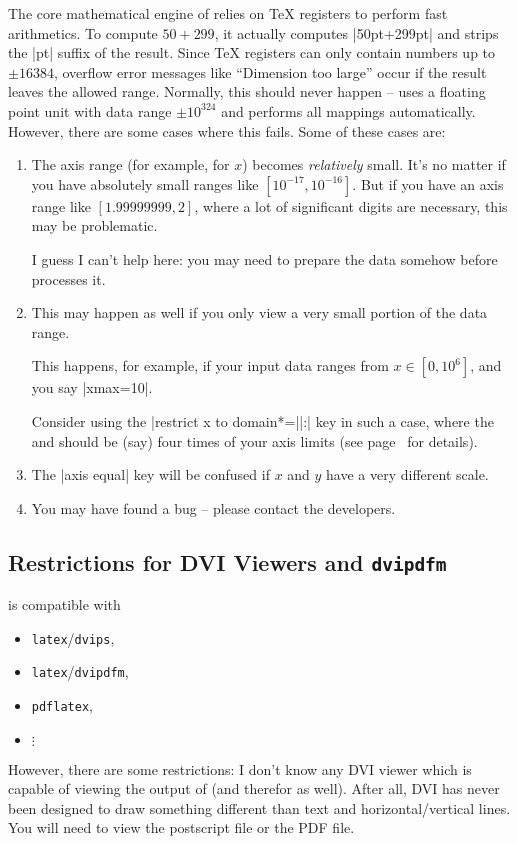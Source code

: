 The core mathematical engine of \PGF{} relies on \TeX{} registers to perform
fast arithmetics. To compute $50+299$, it actually computes |50pt+299pt| and
strips the |pt| suffix of the result. Since \TeX{} registers can only contain
numbers up to $\pm 16384$, overflow error messages like ``Dimension too large''
occur if the result leaves the allowed range. Normally, this should never
happen -- \PGFPlots{} uses a floating point unit with data range $\pm 10^{324}$
and performs all mappings automatically. However, there are some cases where
this fails. Some of these cases are:
%
\begin{enumerate}
    \item The axis range (for example, for $x$) becomes \emph{relatively}
        small. It's no matter if you have absolutely small ranges like
        $[10^{-17},10^{-16}]$. But if you have an axis range like
        $[1.99999999,2]$, where a lot of significant digits are necessary,
        this may be problematic.

        I guess I can't help here: you may need to prepare the data somehow
        before \PGFPlots{} processes it.
    \item This may happen as well if you only view a very small portion of
        the data range.

        This happens, for example, if your input data ranges from $x\in
        [0,10^6]$, and you say |xmax=10|.

        Consider using the |restrict x to domain*=||:|
        key in such a case, where the  and  should be
        (say) four times of your axis limits (see
        page~\pageref{key:restrict:x:to:domain} for details).
    \item The |axis equal| key will be confused if $x$ and $y$ have a very
        different scale.
    \item You may have found a bug -- please contact the developers.
\end{enumerate}


\subsection{Restrictions for DVI Viewers and \texttt{dvipdfm}}
\label{sec:drivers}

\PGF{} is compatible with
%
\begin{itemize}
    \item \lstinline!latex!/\lstinline!dvips!,
    \item \lstinline!latex!/\lstinline!dvipdfm!,
    \item \lstinline!pdflatex!,
    \item $\vdots$
\end{itemize}
%
However, there are some restrictions: I don't know any DVI viewer which is
capable of viewing the output of \PGF{} (and therefor \PGFPlots{} as well).
After all, DVI has never been designed to draw something different than text
and horizontal/vertical lines. You will need to view the postscript file or the
PDF file.

